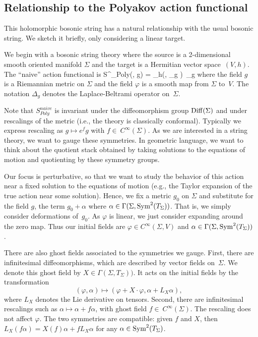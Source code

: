 \subsection{Relationship to the Polyakov action functional}

This holomorphic bosonic string has a natural relationship with the usual bosonic string.
We sketch it briefly, only considering a linear target.

We begin with a bosonic string theory where the source is a 2-dimensional smooth oriented manifold $\Sigma$ and the target is a Hermitian vector space~$(V,h)$. 
The ``naive'' action functional is
\ben
S^{}_{Poly}(\varphi, g) = \int_\Sigma h(\varphi, \Delta_{g} \varphi)\, \dvol_g
\een
where the field $g$ is a Riemannian metric on $\Sigma$ and the field $\varphi$ is a smooth map from $\Sigma$ to~$V$.
The notation $\Delta_g$ denotes the Laplace-Beltrami operator on~$\Sigma$. 

Note that $S^{naive}_{Poly}$ is invariant under the diffeomorphism group ${\rm Diff}(\Sigma)$ and under rescalings of the metric
(i.e., the theory is classically conformal).
Typically we express rescaling as $g \mapsto e^{f} g$ with $f \in~C^\infty(\Sigma)$.
As we are interested in a string theory, we want to gauge these symmetries.
In geometric language, we want to think about the quotient stack 
obtained by taking solutions to the equations of motion and quotienting by these symmetry groups.

Our focus is perturbative, so that we want to study the behavior of this action near a fixed solution to the equations of motion
(e.g., the Taylor expansion of the true action near some solution).
Hence, we fix a metric $g_0$ on $\Sigma$ and substitute for the field $g$,
the term $g_0+\alpha$ where $\alpha \in \Gamma(\Sigma,{\rm Sym}^2(T_\Sigma))$.
That is, we simply consider deformations of~$g_0$.
As $\varphi$ is linear, we just consider expanding around the zero map.
Thus our initial fields are $\varphi \in C^\infty(\Sigma,V)$ and $\alpha \in \Gamma(\Sigma,{\rm Sym}^2(T_\Sigma))$.

There are also ghost fields associated to the symmetries we gauge.
First, there are infinitesimal diffeomorphisms,  which are described by vector fields on~$\Sigma$.
We denote this ghost field by $X \in \Gamma(\Sigma,T_\Sigma))$.
It acts on the initial fields by the transformation 
\[
(\varphi,\alpha) \mapsto (\varphi + X \cdot \varphi, \alpha + L_X \alpha), 
\]
where $L_X$ denotes the Lie derivative on tensors.
Second, there are infinitesimal rescalings such as $\alpha \mapsto \alpha + f \alpha$, 
with ghost field $f \in~C^\infty(\Sigma)$.
The rescaling does not affect $\varphi$.
The two symmetries are compatible: 
given $f$ and $X$, then $L_{X} (f \alpha) = X(f) \alpha + f L_X \alpha$ for any $\alpha \in {\rm Sym}^2(T_\Sigma)$.

